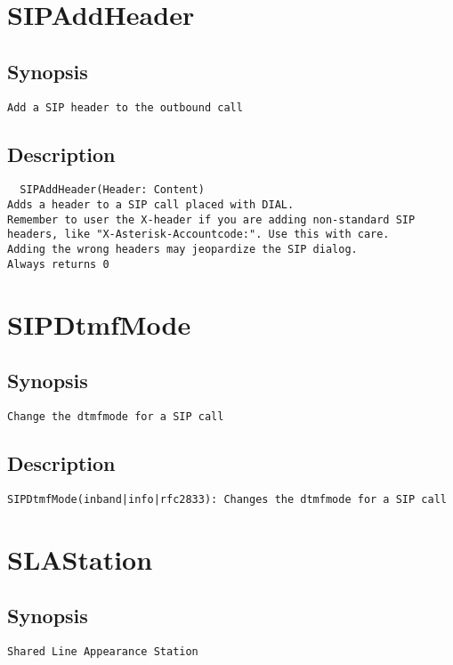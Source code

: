 \section{SIPAddHeader}
\subsection{Synopsis}
\begin{verbatim}
Add a SIP header to the outbound call
\end{verbatim}
\subsection{Description}
\begin{verbatim}
  SIPAddHeader(Header: Content)
Adds a header to a SIP call placed with DIAL.
Remember to user the X-header if you are adding non-standard SIP
headers, like "X-Asterisk-Accountcode:". Use this with care.
Adding the wrong headers may jeopardize the SIP dialog.
Always returns 0

\end{verbatim}


\section{SIPDtmfMode}
\subsection{Synopsis}
\begin{verbatim}
Change the dtmfmode for a SIP call
\end{verbatim}
\subsection{Description}
\begin{verbatim}
SIPDtmfMode(inband|info|rfc2833): Changes the dtmfmode for a SIP call

\end{verbatim}


\section{SLAStation}
\subsection{Synopsis}
\begin{verbatim}
Shared Line Appearance Station
\end{verbatim}
